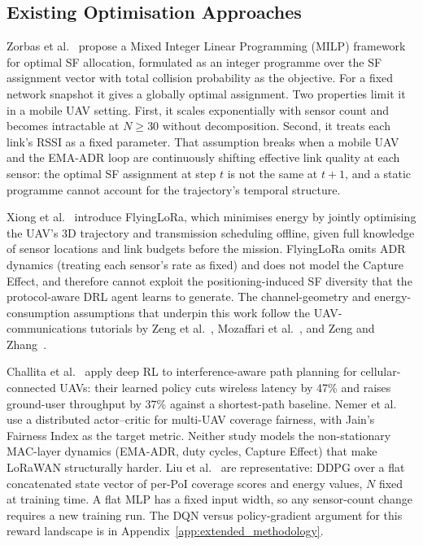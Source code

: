 \subsection{Existing Optimisation Approaches}

Zorbas et al.~\cite{zorbas2025revisiting} propose a Mixed Integer Linear Programming (MILP) framework for optimal SF allocation, formulated as an integer programme over the SF assignment vector with total collision probability as the objective. For a fixed network snapshot it gives a globally optimal assignment. Two properties limit it in a mobile UAV setting. First, it scales exponentially with sensor count and becomes intractable at $N{\ge}30$ without decomposition. Second, it treats each link's RSSI as a fixed parameter. That assumption breaks when a mobile UAV and the EMA-ADR loop are continuously shifting effective link quality at each sensor: the optimal SF assignment at step $t$ is not the same at $t+1$, and a static programme cannot account for the trajectory's temporal structure.

Xiong et al.~\cite{xiong2023flyinglora} introduce FlyingLoRa, which
minimises energy by jointly optimising the UAV's 3D trajectory and
transmission scheduling offline, given full knowledge of sensor
locations and link budgets before the mission. FlyingLoRa omits ADR
dynamics (treating each sensor's rate as fixed) and does not model
the Capture Effect, and therefore cannot exploit the
positioning-induced SF diversity that the protocol-aware DRL agent
learns to generate. The channel-geometry and energy-consumption
assumptions that underpin this work follow the UAV-communications
tutorials by Zeng et al.~\cite{zeng2016wireless},
Mozaffari et al.~\cite{mozaffari2019tutorial}, and
Zeng and Zhang~\cite{zeng2017energy}.

Challita et al.~\cite{challita2018interference} apply deep RL to
interference-aware path planning for cellular-connected UAVs: their
learned policy cuts wireless latency by 47\% and raises ground-user
throughput by 37\% against a shortest-path baseline. Nemer et
al.~\cite{nemer2022energyefficient} use a distributed actor--critic
for multi-UAV coverage fairness, with Jain's Fairness Index as the
target metric. Neither study models the non-stationary MAC-layer
dynamics (EMA-ADR, duty cycles, Capture Effect) that make LoRaWAN
structurally harder. Liu et al.~\cite{liu2019uav} are representative:
DDPG over a flat concatenated state vector of per-PoI coverage scores
and energy values, $N$ fixed at training time. A flat MLP has a fixed
input width, so any sensor-count change requires a new training run.
The DQN versus policy-gradient argument for this reward landscape is
in Appendix~\ref{app:extended_methodology}.
